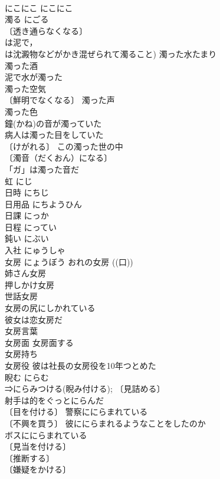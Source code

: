 \documentclass[8pt]{extreport}
\begin{document}
\begin{CJK}{UTF8}{min}
\\	にこにこ	にこにこ	
\\	濁る	にごる	
\\	〔透き通らなくなる〕
\\	は泥で，
\\	は沈澱物などがかき混ぜられて濁ること) 濁った水たまり 
\\	濁った酒 
\\	泥で水が濁った 
\\	濁った空気 
\\	〔鮮明でなくなる〕 濁った声 
\\	濁った色 
\\	鐘(かね)の音が濁っていた 
\\	病人は濁った目をしていた 
\\	〔けがれる〕 この濁った世の中 
\\	〔濁音（だくおん）になる〕　
\\	「ガ」は濁った音だ 
\\	虹	にじ	
\\	日時	にちじ	
\\	日用品	にちようひん	
\\	日課	にっか	
\\	日程	にってい	
\\	鈍い	にぶい	
\\	入社	にゅうしゃ	
\\	女房	にょうぼう	おれの女房 ((口)) 
\\	姉さん女房 
\\	押しかけ女房 
\\	世話女房 
\\	女房の尻にしかれている 
\\	彼女は恋女房だ 
\\	女房言葉 
\\	女房面 女房面する 
\\	女房持ち 
\\	女房役 彼は社長の女房役を10年つとめた 
\\	睨む	にらむ	
\\	⇒にらみつける(睨み付ける); 〔見詰める〕
\\	射手は的をぐっとにらんだ 
\\	〔目を付ける〕 警察ににらまれている 
\\	〔不興を買う〕 彼ににらまれるようなことをしたのか 
\\	ボスににらまれている 
\\	〔見当を付ける〕
\\	〔推断する〕
\\	〔嫌疑をかける〕

\end{CJK}
\end{document}

